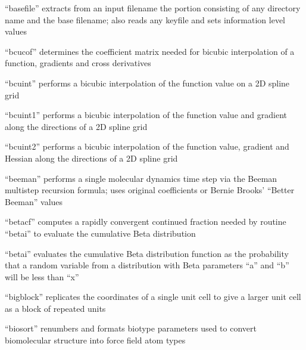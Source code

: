 \documentclass[letterpaper,11pt,english]{sphinxmanual}
\begin{document}


“basefile” extracts from an input filename the portion
consisting of any directory name and the base filename;
also reads any keyfile and sets information level values


“bcucof” determines the coefficient matrix needed for bicubic
interpolation of a function, gradients and cross derivatives


“bcuint” performs a bicubic interpolation of the function
value on a 2D spline grid


“bcuint1” performs a bicubic interpolation of the function
value and gradient along the directions of a 2D spline grid


“bcuint2” performs a bicubic interpolation of the function value,
gradient and Hessian along the directions of a 2D spline grid


“beeman” performs a single molecular dynamics time step
via the Beeman multistep recursion formula; uses original
coefficients or Bernie Brooks’ “Better Beeman” values


“betacf” computes a rapidly convergent continued fraction needed
by routine “betai” to evaluate the cumulative Beta distribution


“betai” evaluates the cumulative Beta distribution function
as the probability that a random variable from a distribution
with Beta parameters “a” and “b” will be less than “x”


“bigblock” replicates the coordinates of a single unit cell
to give a larger unit cell as a block of repeated units


“biosort” renumbers and formats biotype parameters used to
convert biomolecular structure into force field atom types
\end{document}
